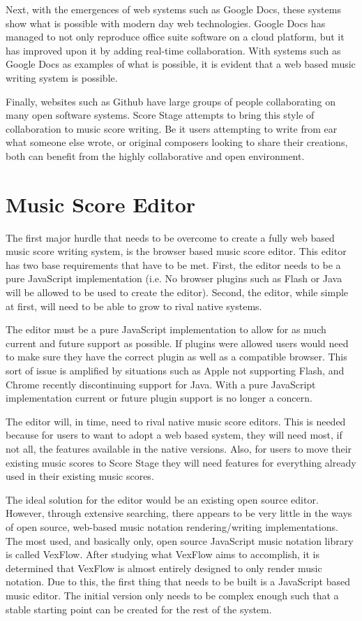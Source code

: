 \documentclass[letterpaper,12pt]{article}
\begin{document}
Next, with the emergences of web systems such as Google Docs, these systems show what is possible with modern day web
technologies. Google Docs has managed to not only reproduce office suite software on a cloud platform, but it has
improved upon it by adding real-time collaboration. With systems such as Google Docs as examples of what is possible,
it is evident that a web based music writing system is possible.

Finally, websites such as Github have large groups of people collaborating on many open software systems. Score Stage
attempts to bring this style of collaboration to music score writing. Be it users attempting to write from ear what
someone else wrote, or original composers looking to share their creations, both can benefit from the highly
collaborative and open environment.

\section{Music Score Editor}

The first major hurdle that needs to be overcome to create a fully web based music score writing system, is the
browser based music score editor. This editor has two base requirements that have to be met. First, the editor
needs to be a pure JavaScript implementation (i.e. No browser plugins such as Flash or Java will be allowed to be used
to create the editor). Second, the editor, while simple at first, will need to be able to grow to rival native systems.

The editor must be a pure JavaScript implementation to allow for as much current and future support as possible. If
plugins were allowed users would need to make sure they have the correct plugin as well as a compatible browser.
This sort of issue is amplified by situations such as Apple not supporting Flash, and Chrome recently discontinuing
support for Java. With a pure JavaScript implementation current or future plugin support is no longer a concern.

The editor will, in time, need to rival native music score editors. This is needed because for users to want to adopt
a web based system, they will need most, if not all, the features available in the native versions. Also, for users to
move their existing music scores to Score Stage they will need features for everything already used in their existing
music scores.

The ideal solution for the editor would be an existing open source editor. However, through extensive searching, there
appears to be very little in the ways of open source, web-based music notation rendering/writing implementations. The
most used, and basically only, open source JavaScript music notation library is called VexFlow. After studying what
VexFlow aims to accomplish, it is determined that VexFlow is almost entirely designed to only render music notation. Due
to this, the first thing that needs to be built is a JavaScript based music editor. The initial version only needs to be
complex enough such that a stable starting point can be created for the rest of the system.
\end{document}
